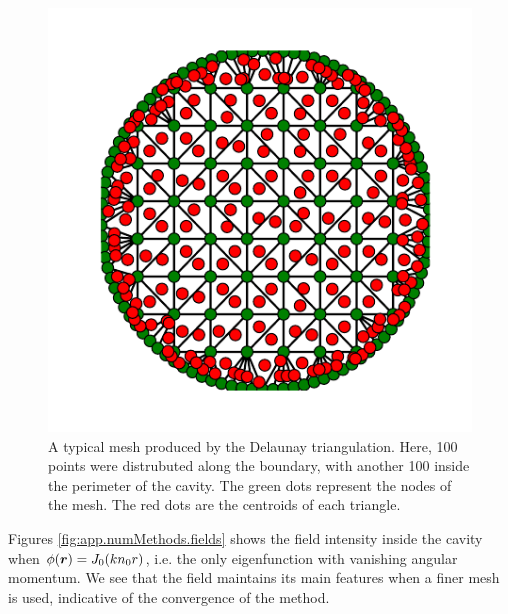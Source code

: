 \begin{figure}
	\centering
	\includegraphics{figs/backmatter/meshCircle-100.pdf}
	\caption[Typical Delaunay triangulation mesh]
			{A typical mesh produced by the Delaunay triangulation.
			Here, 100 points were distrubuted along the boundary,  
			with another 100 inside the perimeter of the cavity. The green
			dots represent the nodes of the mesh. The red dots are the centroids
			of each triangle.}
	\label{fig:app.numMethods.meshDelaunayCircle}
\end{figure}

Figures \ref{fig:app.numMethods.fields} shows the field intensity
inside the cavity when $\phi(\boldsymbol{r})=J_0(kn_0r)$, i.e. the only
eigenfunction with vanishing angular momentum. We see that the field
maintains its main features when a finer mesh is used, indicative
of the convergence of the method. 

